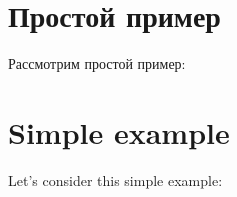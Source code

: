 \ifdefined\RUSSIAN
\section{Простой пример}

Рассмотрим простой пример:
\fi

\ifdefined\ENGLISH
\section{Simple example}

Let's consider this simple example:
\fi




\ifdefined\IncludeARM

\fi
\ifdefined\IncludeMIPS
\EN{}
\RU{}
\fi

